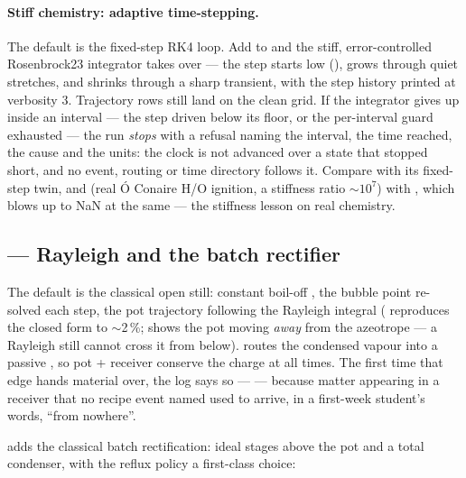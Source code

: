 \documentclass[11pt,a4paper]{article}
\begin{document}
\paragraph{Stiff chemistry: adaptive time-stepping.}  The default is
the fixed-step RK4 loop.  Add  to
 and the stiff, error-controlled Rosenbrock23
integrator takes over --- the step starts low (), grows
through quiet stretches, and shrinks through a sharp transient, with the step
history printed at verbosity 3.  Trajectory rows still land on the
clean  grid.  If the integrator gives up inside an
interval --- the step driven below its floor, or the per-interval guard
 exhausted --- the run
\emph{stops} with a refusal naming the interval, the time reached, the
cause and the units: the clock is not advanced over a state that stopped
short, and no event, routing or time directory follows it.  Compare
 with its fixed-step twin, and
 (real \'O Conaire H/O ignition, a stiffness
ratio $\sim 10^{7}$) with , which blows up to NaN at
the same  --- the stiffness lesson on real chemistry.

\subsection{ --- Rayleigh and the batch rectifier}

The default  is the classical open still:
constant boil-off , the bubble point re-solved each step,
the pot trajectory following the Rayleigh integral
( reproduces the closed form to
$\sim$2\,\%;  shows the pot moving
\emph{away} from the azeotrope --- a Rayleigh still cannot cross it from
below).   routes the condensed vapour into
a passive , so pot + receiver conserve the
charge at all times.  The first time that edge hands material over, the
log says so ---  --- because matter appearing in a receiver that no recipe
event named used to arrive, in a first-week student's words, ``from
nowhere''.

 adds the classical batch rectification:
 ideal stages above the pot and a total condenser, with
the reflux policy a first-class choice:
\end{document}
